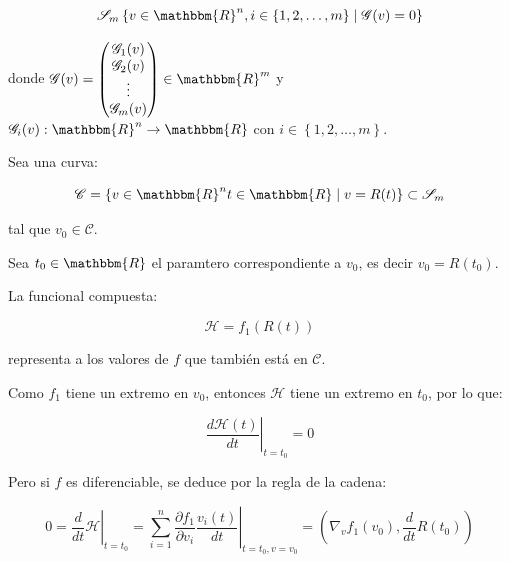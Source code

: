             \begin{equation}
                \mathscr{S}_m \left\{ v \in \mathbbm{R}^n, i \in \left\{ 1, 2, \dots, m \right\} \mid \mathscr{G}(v) = 0 \right\}
            \end{equation}

            donde $\mathscr{G}(v) = \begin{pmatrix} \mathscr{G}_1(v) \\ \mathscr{G}_2(v) \\ \vdots \\ \mathscr{G}_m(v) \end{pmatrix} \in \mathbbm{R}^m$
                y $\mathscr{G}_i(v):\mathbbm{R}^n \to \mathbbm{R}$
                con $i \in \left\{ 1,2,\dots,m \right\}$.

            Sea una curva:

            \begin{equation}
                \mathscr{C} = \left\{ v\in \mathbbm{R}^n t \in \mathbbm{R} \mid v = R(t) \right\} \subset \mathscr{S}_m
            \end{equation}

            tal que $v_0 \in \mathscr{C}$.

            Sea $t_0 \in \mathbbm{R}$ el paramtero correspondiente a $v_0$, es decir $v_0 = R(t_0)$.

            La funcional compuesta:

            \begin{equation}
                \mathscr{H} = f_1(R(t))
            \end{equation}

            representa a los valores de $f$  que también está en $\mathscr{C}$.

            Como $f_1$ tiene un extremo en $v_0$, entonces $\mathscr{H}$ tiene un extremo en $t_0$, por lo que:

            \begin{equation}
                \left. \frac{d \mathscr{H}(t)}{dt} \right|_{t=t_0} = 0
            \end{equation}

            Pero si $f$ es diferenciable, se deduce por la regla de la cadena:

            \begin{equation}
                0 = \left. \frac{d}{dt} \mathscr{H} \right|_{t=t_0} = \left. \sum_{i=1}^n \frac{\partial f_1}{\partial v_i} \frac{v_i(t)}{dt} \right|_{t=t_0, v=v_0} = \left( \nabla_v f_1(v_0), \frac{d}{dt} R(t_0) \right)
            \end{equation}

